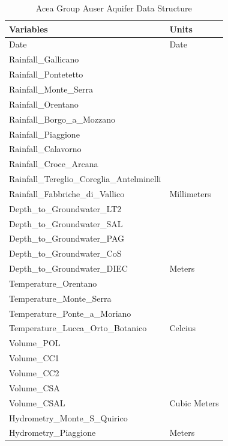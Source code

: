 \documentclass[
]{article}
\begin{document}
\begin{table}[!h]
\centering
\caption{\label{tab:data head and data variables kable}Acea Group Auser Aquifer Data Structure}
\centering
\fontsize{12}{14}\selectfont
\begin{tabular}[t]{l|l}
\hline
Variables & Units\\
\hline
Date & Date\\
\cline{1-2}
Rainfall\_Gallicano & \\
\cline{1-1}
Rainfall\_Pontetetto & \\
\cline{1-1}
Rainfall\_Monte\_Serra & \\
\cline{1-1}
Rainfall\_Orentano & \\
\cline{1-1}
Rainfall\_Borgo\_a\_Mozzano & \\
\cline{1-1}
Rainfall\_Piaggione & \\
\cline{1-1}
Rainfall\_Calavorno & \\
\cline{1-1}
Rainfall\_Croce\_Arcana & \\
\cline{1-1}
Rainfall\_Tereglio\_Coreglia\_Antelminelli & \\
\cline{1-1}
Rainfall\_Fabbriche\_di\_Vallico & \multirow[t]{-10}{*}{\raggedright\arraybackslash Millimeters}\\
\cline{1-2}
Depth\_to\_Groundwater\_LT2 & \\
\cline{1-1}
Depth\_to\_Groundwater\_SAL & \\
\cline{1-1}
Depth\_to\_Groundwater\_PAG & \\
\cline{1-1}
Depth\_to\_Groundwater\_CoS & \\
\cline{1-1}
Depth\_to\_Groundwater\_DIEC & \multirow[t]{-5}{*}{\raggedright\arraybackslash Meters}\\
\cline{1-2}
Temperature\_Orentano & \\
\cline{1-1}
Temperature\_Monte\_Serra & \\
\cline{1-1}
Temperature\_Ponte\_a\_Moriano & \\
\cline{1-1}
Temperature\_Lucca\_Orto\_Botanico & \multirow[t]{-4}{*}{\raggedright\arraybackslash Celcius}\\
\cline{1-2}
Volume\_POL & \\
\cline{1-1}
Volume\_CC1 & \\
\cline{1-1}
Volume\_CC2 & \\
\cline{1-1}
Volume\_CSA & \\
\cline{1-1}
Volume\_CSAL & \multirow[t]{-5}{*}{\raggedright\arraybackslash Cubic Meters}\\
\cline{1-2}
Hydrometry\_Monte\_S\_Quirico & \\
\cline{1-1}
Hydrometry\_Piaggione & \multirow[t]{-2}{*}{\raggedright\arraybackslash Meters}\\
\hline
\end{tabular}
\end{table}
\end{document}
